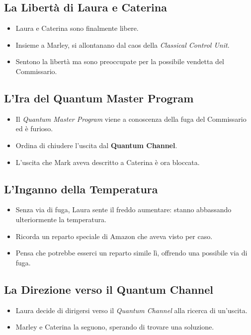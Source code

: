 \subsection*{La Libertà di Laura e Caterina}

\begin{itemize}
    \item Laura e Caterina sono finalmente libere.
    \item Insieme a Marley, si allontanano dal caos della \emph{Classical Control Unit}.
    \item Sentono la libertà ma sono preoccupate per la possibile vendetta del Commissario.
\end{itemize}

\subsection*{L'Ira del Quantum Master Program}

\begin{itemize}
    \item Il \emph{Quantum Master Program} viene a conoscenza della fuga del Commissario ed è furioso.
    \item Ordina di chiudere l'uscita dal \textbf{Quantum Channel}.
    \item L'uscita che Mark aveva descritto a Caterina è ora bloccata.
\end{itemize}

\subsection*{L'Inganno della Temperatura}

\begin{itemize}
    \item Senza via di fuga, Laura sente il freddo aumentare: stanno abbassando ulteriormente la temperatura.
    \item Ricorda un reparto speciale di Amazon che aveva visto per caso.
    \item Pensa che potrebbe esserci un reparto simile lì, offrendo una possibile via di fuga.
\end{itemize}

\subsection*{La Direzione verso il Quantum Channel}

\begin{itemize}
    \item Laura decide di dirigersi verso il \emph{Quantum Channel} alla ricerca di un'uscita.
    \item Marley e Caterina la seguono, sperando di trovare una soluzione.
\end{itemize}

